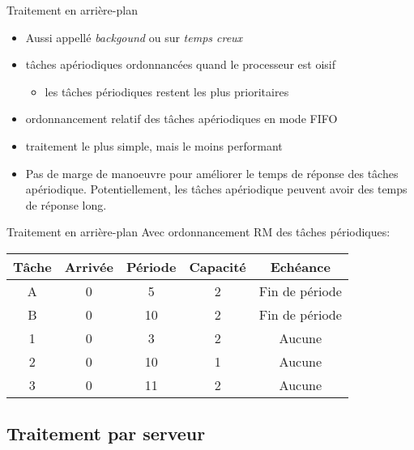 \begin{frame}{Traitement en arrière-plan} 
  \begin{itemize}
  \item Aussi appellé \emph{backgound} ou sur \emph{temps creux}
  \item tâches apériodiques ordonnancées quand le processeur est oisif 
    \begin{itemize}
    \item les tâches périodiques restent les plus prioritaires 
    \end{itemize}
  \item ordonnancement relatif des tâches apériodiques en mode FIFO 
  \item traitement le plus simple, mais le moins performant 
  \item Pas de  marge de manoeuvre pour améliorer  le temps de réponse
    des  tâches apériodique.  Potentiellement, les  tâches apériodique
    peuvent avoir des temps de réponse long.
  \end{itemize}
\end{frame}

\begin{frame}{Traitement en arrière-plan} 
  Avec ordonnancement RM des tâches périodiques:
  \begin{center}
    \begin{tabular}{ccccc}
      \hline
      Tâche & Arrivée & Période & Capacité & Echéance \\
      \hline
      A & 0 &  5 & 2 & Fin de période\\
      B & 0 & 10 & 2 & Fin de période\\
      1 & 0 &  3 & 2 & Aucune\\
      2 & 0 & 10 & 1 & Aucune\\
      3 & 0 & 11 & 2 & Aucune\\
      \hline
    \end{tabular}

    
  \end{center}
\end{frame} 

\subsection{Traitement par serveur}

